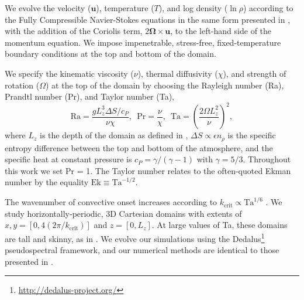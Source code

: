 \documentclass[twocolumn, amsmath, amsfonts, amssymb, trackchanges]{aastex62}
\begin{document}
We evolve the velocity ($\bm{u}$), temperature ($T$), 
and log density ($\ln\rho$) according to the Fully Compressible Navier-Stokes equations
in the same form presented in \AB, with the
addition of the Coriolis term, \mbox{$2\bm{\Omega}\times\bm{u}$}, to the left-hand side
of the momentum equation. 
We impose impenetrable, stress-free, fixed-temperature boundary conditions at the top and bottom of the domain.


We specify the kinematic viscosity ($\nu$), thermal diffusivity ($\chi$), and strength of
rotation ($\Omega$) at the top of the domain by choosing the Rayleigh number 
(Ra), Prandtl number (Pr), and Taylor number (Ta),
\begin{equation}
    \text{Ra} = \frac{g L_z^3 \Delta S / c_P}{\nu \chi}, \,\,\,
    \text{Pr} = \frac{\nu}{\chi}, \,\,\,
    \text{Ta} = \left(\frac{2 \Omega L_z^2}{\nu}\right)^2,
	\label{eqn:input_parameters}
\end{equation}
where $L_z$ is the depth of the domain as defined in \AB, 
$\Delta S \propto \epsilon n_\rho$ is the specific entropy difference between
the top and bottom of the atmosphere, and the specific heat at constant pressure is $c_P = \gamma/(\gamma-1)$
with $\gamma = 5/3$.
Throughout this work we set Pr = 1. The Taylor number relates to the often-quoted
Ekman number by the equality $\text{Ek} \equiv \text{Ta}^{-1/2}$.


The wavenumber of convective onset increases according to $k_{\text{crit}} \propto \text{Ta}^{1/6}$
\citep{Chandrasekhar,calkins&all2015a}.
We study horizontally-periodic, 3D Cartesian domains with extents of
$x, y = [0, 4(2\pi/k_{\text{crit}})]$ and $z = [0, L_z]$. At large values of Ta, these
domains are tall and skinny, as in \cite{stellmach&all2014}.
We evolve our simulations using the Dedalus\footnote{\url{http://dedalus-project.org/}} 
pseudospectral framework, and our numerical methods are identical to those presented
in \AB.
\end{document}

